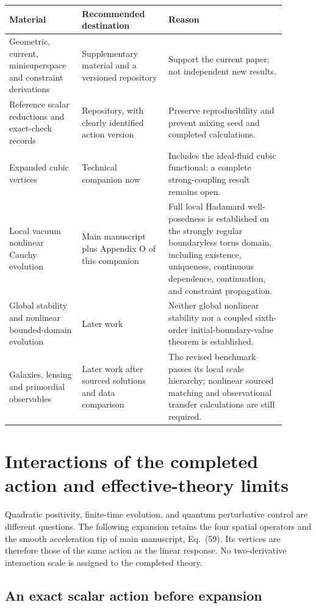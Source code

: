 \documentclass[aps,prd,reprint,onecolumn,notitlepage,nofootinbib,longbibliography,floatfix]{revtex4-2}
\theoremstyle{scstyle}
\theoremstyle{definition}
\theoremstyle{remark}
\begin{document}
\begin{center}\small
\begin{tabular}{p{0.23\linewidth}p{0.29\linewidth}p{0.38\linewidth}}
\toprule Material & Recommended destination & Reason \\
\midrule
Geometric, current, minisuperspace and constraint derivations & Supplementary material and a versioned repository & Support the current paper; not independent new results. \\
Reference scalar reductions and exact-check records & Repository, with clearly identified action version & Preserve reproducibility and prevent mixing seed and completed calculations. \\
Expanded cubic vertices & Technical companion now & Includes the ideal-fluid cubic functional; a complete strong-coupling result remains open. \\
Local vacuum nonlinear Cauchy evolution & Main manuscript plus Appendix O of this companion & Full local Hadamard well-posedness is established on the strongly regular boundaryless torus domain, including existence, uniqueness, continuous dependence, continuation, and constraint propagation. \\
Global stability and nonlinear bounded-domain evolution & Later work & Neither global nonlinear stability nor a coupled sixth-order initial-boundary-value theorem is established. \\
Galaxies, lensing and primordial observables & Later work after sourced solutions and data comparison & The revised benchmark passes its local scale hierarchy; nonlinear sourced matching and observational transfer calculations are still required. \\
\bottomrule
\end{tabular}
\end{center}
\clearpage
\section{Interactions of the completed action and effective-theory limits}
\label{sec:eftcontrol}
Quadratic positivity, finite-time evolution, and quantum perturbative
control are different questions. The following expansion retains the
four spatial operators and the smooth acceleration tip of
main manuscript, Eq.~(59). Its vertices are therefore those of the same
action as the linear response. No two-derivative interaction scale is
assigned to the completed theory.

\subsection{An exact scalar action before expansion}
\end{document}

